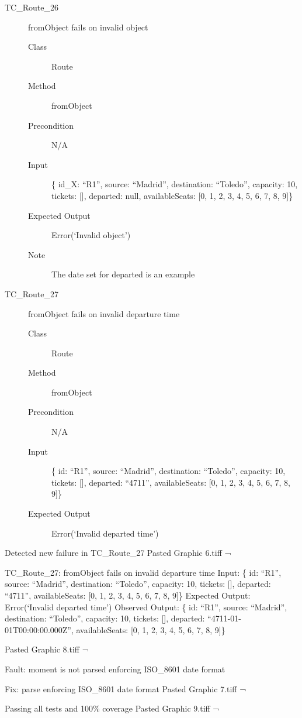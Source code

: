 \documentclass[11pt]{article}
\begin{document}
\begin{description}
\item[{TC\_Route\_26}] fromObject fails on invalid object
\begin{description}
\item[{Class}] Route
\item[{Method}] fromObject
\item[{Precondition}] N/A
\item[{Input}] \{ id\_X: “R1”, source: “Madrid”, destination: “Toledo”, capacity: 10,  tickets: [], departed: null, availableSeats: [0, 1, 2, 3, 4, 5, 6, 7, 8, 9]\}
\item[{Expected Output}] Error(‘Invalid object’)
\item[{Note}] The date set for departed is an example
\end{description}

\item[{TC\_Route\_27}] fromObject fails on invalid departure time
\begin{description}
\item[{Class}] Route
\item[{Method}] fromObject
\item[{Precondition}] N/A
\item[{Input}] \{ id: “R1”, source: “Madrid”, destination: “Toledo”, capacity: 10,  tickets: [], departed: “4711”, availableSeats: [0, 1, 2, 3, 4, 5, 6, 7, 8, 9]\}
\item[{Expected Output}] Error(‘Invalid departed time’)
\end{description}
\end{description}


Detected new failure in TC\_Route\_27
Pasted Graphic 6.tiff ¬


TC\_Route\_27:    fromObject fails on invalid departure time
Input:      \{ id: “R1”, source: “Madrid”, destination: “Toledo”, capacity: 10,  tickets: [], departed: “4711”, availableSeats: [0, 1, 2, 3, 4, 5, 6, 7, 8, 9]\}
Expected Output:  Error(‘Invalid departed time’)
Observed Output:  \{ id: “R1”, source: “Madrid”, destination: “Toledo”, capacity: 10,  tickets: [], departed: “4711-01-01T00:00:00.000Z”, availableSeats: [0, 1, 2, 3, 4, 5, 6, 7, 8, 9]\}


Pasted Graphic 8.tiff ¬

Fault: moment is not parsed enforcing ISO\_8601 date format

Fix: parse enforcing ISO\_8601 date format
Pasted Graphic 7.tiff ¬


Passing all tests and 100\% coverage
Pasted Graphic 9.tiff ¬
\end{document}
